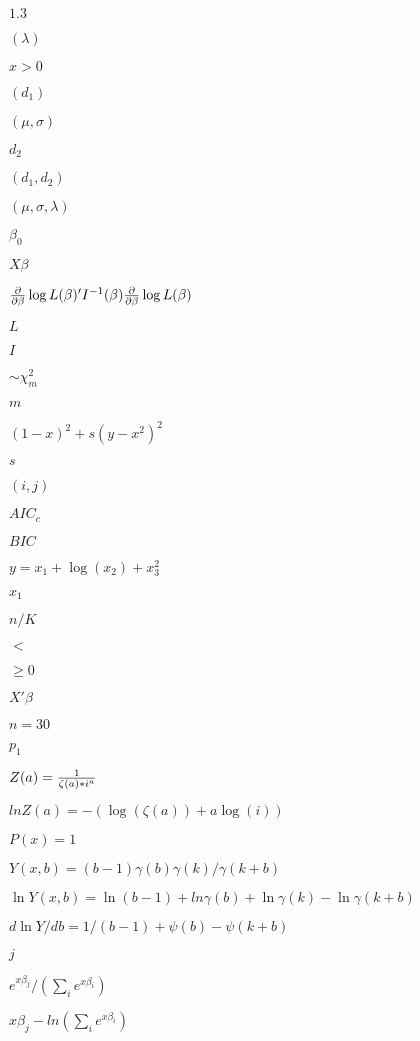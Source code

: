 \documentclass{article}
\begin{document}
$1.3$
\pagebreak

$(\lambda)$
\pagebreak

$x>0$
\pagebreak

$(d_1)$
\pagebreak

$(\mu, \sigma)$
\pagebreak

$d_2$
\pagebreak

$(d_1, d_2)$
\pagebreak

$(\mu, \sigma, \lambda)$
\pagebreak

$\beta_0$
\pagebreak

$X\beta$
\pagebreak

${\partial\over \partial\beta}\log L(\beta)'I^{-1}(\beta){\partial\over \partial\beta}\log L(\beta)$
\pagebreak

$L$
\pagebreak

$I$
\pagebreak

$\sim \chi^2_m$
\pagebreak

$m$
\pagebreak

$(1-x)^2+ s(y - x^2)^2$
\pagebreak

$s$
\pagebreak

$(i,j)$
\pagebreak

$AIC_c$
\pagebreak

$BIC$
\pagebreak

$y = x_1 + \log(x_2) + x_3^2$
\pagebreak

$x_1$
\pagebreak

$n/K$
\pagebreak

$<$
\pagebreak

$\geq 0$
\pagebreak

$X'\beta$
\pagebreak

$n=30$
\pagebreak

$p_1$
\pagebreak

$Z(a) = {1\over \zeta(a) * i^a} $
\pagebreak

$lnZ(a) = -(\log(\zeta(a)) + a \log(i)) $
\pagebreak

$P(x) = 1$
\pagebreak

$ Y(x, b) = (b-1) \gamma(b) \gamma(k) / \gamma(k+b) $
\pagebreak

$ \ln Y(x, b) = \ln(b-1) + ln\gamma(b) + \ln\gamma(k) - \ln\gamma(k+b) $
\pagebreak

$ d\ln Y/db = 1/(b-1) + \psi(b) - \psi(k+b) $
\pagebreak

$j$
\pagebreak

$e^{x\beta_j}/ (\sum_i{e^{x\beta_i}})$
\pagebreak

$x\beta_j - ln(\sum_i{e^{x\beta_i}})$
\pagebreak
\end{document}
